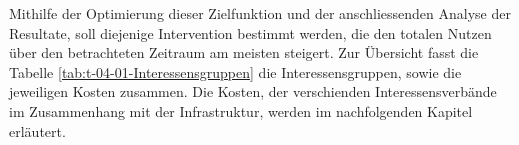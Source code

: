 Mithilfe der Optimierung dieser Zielfunktion und der anschliessenden Analyse der Resultate, soll diejenige Intervention bestimmt werden, die den totalen Nutzen über den betrachteten Zeitraum am meisten steigert. 
Zur Übersicht fasst die Tabelle \ref{tab:t-04-01-Interessensgruppen} die Interessensgruppen, sowie die jeweiligen Kosten zusammen. Die Kosten, der verschienden Interessensverbände im Zusammenhang mit der Infrastruktur, werden im nachfolgenden Kapitel erläutert.



\pagebreak

%

